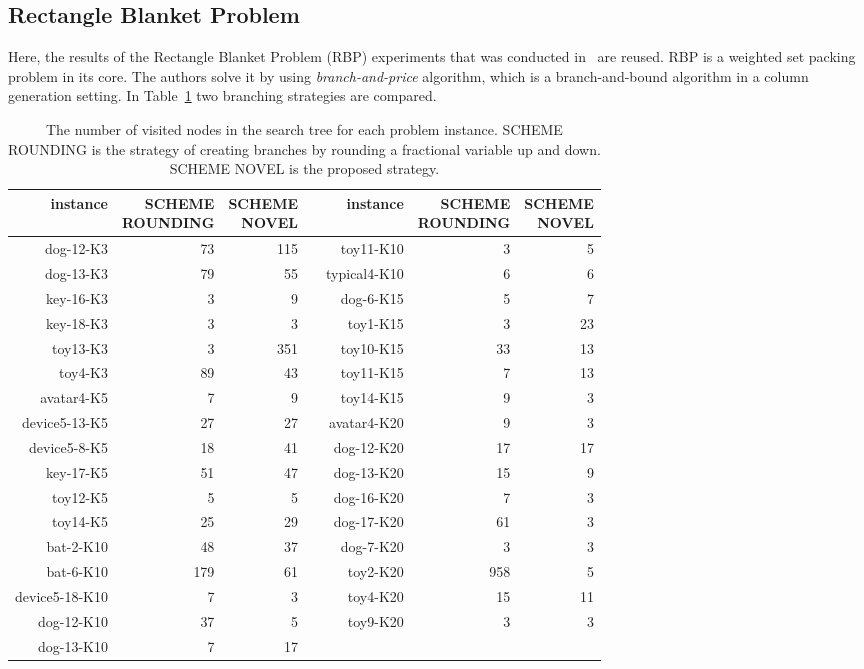 \documentclass{article}
\begin{document}
\subsection{Rectangle Blanket Problem}
Here, the results of the Rectangle Blanket Problem (RBP) experiments that was conducted in~\cite{demiroz2019} are reused. RBP is a weighted set packing problem in its core. The authors solve it by using \emph{branch-and-price} algorithm, which is a branch-and-bound algorithm in a column generation setting. In Table~\ref{tab:branching-comparison} two branching strategies are compared. 

\begin{table}[!htbp]
   \caption{The number of visited nodes in the search tree for each problem instance. SCHEME ROUNDING is the strategy of creating branches by rounding a fractional variable up and down. SCHEME NOVEL is the proposed strategy.}
   \begin {center}
   \begin{tabular}{r rr r r rr}
   \toprule
	instance & \shortstack{SCHEME\\ROUNDING} & \shortstack{SCHEME\\NOVEL} & \phantom{abcdef}  & instance & \shortstack{SCHEME\\ROUNDING} & \shortstack{SCHEME\\NOVEL}  \\
	\midrule
dog-12-K3 & 73 & 115 & & toy11-K10 & 3 & 5 \\
dog-13-K3 & 79 & 55 & & typical4-K10 & 6 & 6 \\
key-16-K3 & 3 & 9 & & dog-6-K15 & 5 & 7 \\
key-18-K3 & 3 & 3 & & toy1-K15 & 3 & 23 \\
toy13-K3 & 3 & 351 & & toy10-K15 & 33 & 13 \\
toy4-K3 & 89 & 43 & & toy11-K15 & 7 & 13 \\
avatar4-K5 & 7 & 9 & & toy14-K15 & 9 & 3 \\
device5-13-K5 & 27 & 27 & & avatar4-K20 & 9 & 3 \\
device5-8-K5 & 18 & 41 & & dog-12-K20 & 17 & 17 \\
key-17-K5 & 51 & 47 & & dog-13-K20 & 15 & 9 \\
toy12-K5 & 5 & 5 & & dog-16-K20 & 7 & 3 \\
toy14-K5 & 25 & 29 & & dog-17-K20 & 61 & 3 \\
bat-2-K10 & 48 & 37 & & dog-7-K20 & 3 & 3 \\
bat-6-K10 & 179 & 61 & & toy2-K20 & 958 & 5 \\
device5-18-K10 & 7 & 3 & & toy4-K20 & 15 & 11 \\
dog-12-K10 & 37 & 5 & & toy9-K20 & 3 & 3 \\
dog-13-K10 & 7 & 17 & &  &  &  \\
  \bottomrule
   \end{tabular}
   \end{center} \label{tab:branching-comparison}
\end{table}
\end{document}

